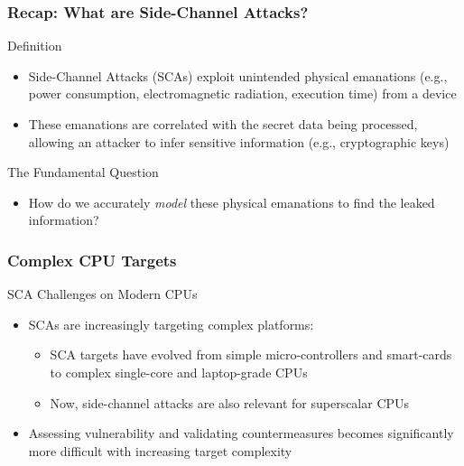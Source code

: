 \begin{frame}
    \frametitle{Recap: What are Side-Channel Attacks?}
    \begin{block}{Definition}
        \begin{itemize}
            \item Side-Channel Attacks (SCAs) exploit unintended physical emanations (e.g., power consumption, electromagnetic radiation, execution time) from a device
            \item These emanations are correlated with the secret data being processed, allowing an attacker to infer sensitive information (e.g., cryptographic keys)
        \end{itemize}
    \end{block}

    \begin{block}{The Fundamental Question }
        \begin{itemize}
            \item How do we accurately \textit{model} these physical emanations to find the leaked information?
        \end{itemize}
    \end{block}
\end{frame}
\begin{frame}
    \frametitle{Complex CPU Targets}
    \begin{block}{SCA Challenges on Modern CPUs}
    \begin{itemize}
        \item SCAs are increasingly targeting complex platforms:
            \begin{itemize}
                \item SCA targets have evolved from simple micro-controllers and smart-cards to complex single-core and laptop-grade CPUs
                \item Now, side-channel attacks are also relevant for superscalar CPUs
            \end{itemize}
        \item Assessing vulnerability and validating countermeasures becomes significantly more difficult with increasing target complexity
    \end{itemize}
    \end{block}
\end{frame}


